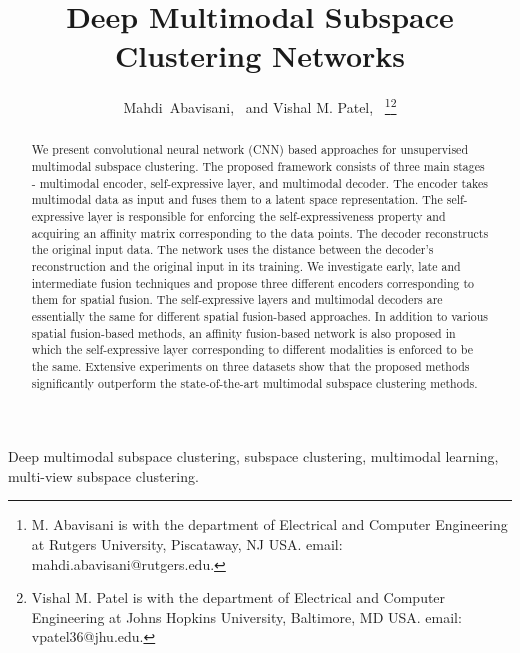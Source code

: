 \documentclass[journal]{IEEEtran}
\begin{document}
\title{Deep Multimodal Subspace Clustering Networks}

\author{{Mahdi~Abavisani,~ and
Vishal M.		Patel,~} 
\thanks{M.		Abavisani is with the department of Electrical and Computer Engineering at Rutgers University, 
   Piscataway, NJ USA.		email: mahdi.abavisani@rutgers.edu.		}\thanks{Vishal M.		Patel is with the department of Electrical and Computer Engineering at Johns Hopkins University, Baltimore, MD USA.		email: vpatel36@jhu.edu.}
}





\maketitle

\begin{abstract}
    We present convolutional neural network (CNN) based approaches for unsupervised multimodal subspace clustering.  The proposed framework  consists of three main stages - multimodal encoder, self-expressive layer, and multimodal decoder.  The encoder takes multimodal data as input and fuses them to a latent space representation. The self-expressive layer is responsible for enforcing the self-expressiveness property and acquiring an affinity matrix corresponding to the data points.   The decoder reconstructs the original input data.  The network uses the distance between the decoder's reconstruction and the original input in its training.  We investigate early, late and intermediate fusion techniques and propose three different encoders corresponding to them for spatial fusion.  The self-expressive layers and multimodal decoders are essentially the same for different spatial fusion-based approaches.  In addition to various spatial fusion-based methods, an affinity fusion-based network is also proposed in which the self-expressive layer corresponding to different modalities is enforced to be the same.     Extensive experiments on three datasets show that the proposed methods significantly outperform the state-of-the-art multimodal subspace clustering methods.      
	
 \end{abstract}

\begin{IEEEkeywords}
Deep multimodal subspace clustering, subspace clustering, multimodal learning, multi-view subspace clustering.
\end{IEEEkeywords}
\end{document}
